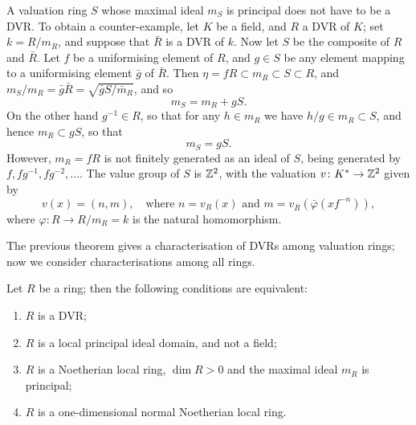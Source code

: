 \begin{remark}
A valuation ring $S$ whose maximal ideal $m_S$ is principal does not
have to be a DVR. To obtain a counter-example, let $K$ be a field, and $R$
a DVR of $K$; set $k = R/m_R$, and suppose that $\bar{R}$ is a DVR of $k$. Now let
$S$ be the composite of $R$ and $\bar{R}$. Let $f$ be a uniformising element of $R$, and
$g \in S$ be any element mapping to a uniformising element $\bar{g}$ of $\bar{R}$. Then
$\eta = fR \subset m_R \subset S \subset R$, and $m_S/m_R = \bar{g}\bar{R} = \sqrt{\bar{g}S/\bar{m}_R}$, and so
\[
  m_S = m_R + gS.
\]
On the other hand $g^{-1} \in R$, so that for any $h \in m_R$ we have $h/g \in m_R \subset S$, and
hence $m_R \subset gS$, so that
\[
  m_S = gS.
\]
However, $m_R = fR$ is not finitely generated as an ideal of $S$, being generated
by $f, fg^{-1}, fg^{-2}, \ldots$. The value group of $S$ is $\mathbb{Z}^2$, with the valuation
$v\colon K^* \to \mathbb{Z}^2$ given by
\[
  v(x) = (n, m), \quad \text{where } n = v_R(x) \text{ and } m = v_{\bar{R}}(\bar{\varphi}(xf^{-n})),
\]
where $\varphi\colon R \to R/m_R = k$ is the natural homomorphism.
\end{remark}

The previous theorem gives a characterisation of DVRs among valuation
rings; now we consider characterisations among all rings.

\begin{theorem}\label{thm:11.2}
Let $R$ be a ring; then the following conditions are
equivalent:
\begin{enumerate}[(1)]
  \item $R$ is a DVR;
  \item $R$ is a local principal ideal domain, and not a field;
  \item $R$ is a Noetherian local ring, $\dim R > 0$ and the maximal ideal $m_R$ is
        principal;
  \item $R$ is a one-dimensional normal Noetherian local ring.
\end{enumerate}
\end{theorem}

